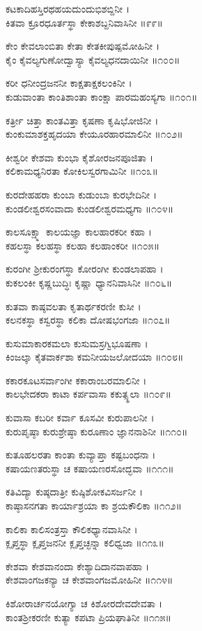 ಕಟಕಾದಿಹಸ್ತಿರಥಹಯದುಂದುಭಿಶಬ್ದಿನೀ ।\\
ಕಿತವಾ ಕ್ರೂರಧೂರ್ತಸ್ಥಾ ಕೇಕಾಶಬ್ದನಿವಾಸಿನೀ ॥೯೯॥

ಕೇಂ ಕೇವಲಾಂಬಿತಾ ಕೇತಾ ಕೇತಕೀಪುಷ್ಪಮೋಹಿನೀ ।\\
ಕೈಂ ಕೈವಲ್ಯಗುಣೋದ್ವಾಸ್ಯಾ ಕೈವಲ್ಯಧನದಾಯಿನೀ ॥೧೦೦॥

ಕರೀ ಧನೀಂದ್ರಜನನೀ ಕಾಕ್ಷತಾಕ್ಷಕಲಂಕಿನೀ ।\\
ಕುಡುವಾಂತಾ ಕಾಂತಿಶಾಂತಾ ಕಾಂಕ್ಷಾ ಪಾರಮಹಂಸ್ಯಗಾ ॥೧೦೧॥

ಕರ್ತ್ರೀ ಚಿತ್ತಾ ಕಾಂತವಿತ್ತಾ ಕೃಷಣಾ ಕೃಷಿಭೋಜಿನೀ ।\\
ಕುಂಕುಮಾಶಕ್ತಹೃದಯಾ ಕೇಯೂರಹಾರಮಾಲಿನೀ ॥೧೦೨॥

ಕೀಶ್ವರೀ ಕೇಶವಾ ಕುಂಭಾ ಕೈಶೋರಜನಪೂಜಿತಾ ।\\
ಕಲಿಕಾಮಧ್ಯನಿರತಾ ಕೋಕಿಲಸ್ವರಗಾಮಿನೀ ॥೧೦೩॥

ಕುರದೇಹಹರಾ ಕುಂಬಾ ಕುಡುಂಬಾ ಕುರಭೇದಿನೀ ।\\
ಕುಂಡಲೀಶ್ವರಸಂವಾದಾ ಕುಂಡಲೀಶ್ವರಮಧ್ಯಗಾ ॥೧೦೪॥

ಕಾಲಸೂಕ್ಷ್ಮಾ ಕಾಲಯಜ್ಞಾ ಕಾಲಹಾರಕರೀ ಕಹಾ ।\\
ಕಹಲಸ್ಥಾ ಕಲಹಸ್ಥಾ ಕಲಹಾ ಕಲಹಾಂಕರೀ ॥೧೦೫॥

ಕುರಂಗೀ ಶ್ರೀಕುರಂಗಸ್ಥಾ ಕೋರಂಗೀ ಕುಂಡಲಾಪಹಾ ।\\
ಕುಕಲಂಕೀ ಕೃಷ್ಣಬುದ್ಧಿಃ ಕೃಷ್ಣಾ ಧ್ಯಾನನಿವಾಸಿನೀ ॥೧೦೬॥

ಕುತವಾ ಕಾಷ್ಠವಲತಾ ಕೃತಾರ್ಥಕರಣೀ ಕುಸೀ ।\\
ಕಲನಕಸ್ಥಾ ಕಸ್ವರಸ್ಥಾ ಕಲಿಕಾ ದೋಷಭಂಗಜಾ ॥೧೦೭॥

ಕುಸುಮಾಕಾರಕಮಲಾ ಕುಸುಮಸ್ರಗ್ವಿಭೂಷಣಾ ।\\
ಕಿಂಜಲ್ಕಾ ಕೈತವಾರ್ಕಶಾ ಕಮನೀಯಜಲೋದಯಾ ॥೧೦೮॥

ಕಕಾರಕೂಟಸರ್ವಾಂಗೀ ಕಕಾರಾಂಬರಮಾಲಿನೀ ।\\
ಕಾಲಭೇದಕರಾ ಕಾಟಾ ಕರ್ಪವಾಸಾ ಕಕುತ್ಸ್ಥಲಾ ॥೧೦೯॥

ಕುವಾಸಾ ಕಬರೀ ಕರ್ವಾ ಕೂಸವೀ ಕುರುಪಾಲನೀ ।\\
ಕುರುಪೃಷ್ಠಾ ಕುರುಶ್ರೇಷ್ಠಾ ಕುರೂಣಾಂ ಜ್ಞಾನನಾಶಿನೀ ॥೧೧೦॥

ಕುತೂಹಲರತಾ ಕಾಂತಾ ಕುವ್ಯಾಪ್ತಾ ಕಷ್ಟಬಂಧನಾ ।\\
ಕಷಾಯಣತರುಸ್ಥಾ ಚ ಕಷಾಯಣರಸೋದ್ಭವಾ ॥೧೧೧॥

ಕತಿವಿದ್ಯಾ ಕುಷ್ಠದಾತ್ರೀ ಕುಷ್ಠಿಶೋಕವಿಸರ್ಜನೀ ।\\
ಕಾಷ್ಠಾಸನಗತಾ ಕಾರ್ಯಾಶ್ರಯಾ ಕಾ ಶ್ರಯಕೌಲಿಕಾ ॥೧೧೨॥

ಕಾಲಿಕಾ ಕಾಲಿಸಂತ್ರಸ್ತಾ ಕೌಲಿಕಧ್ಯಾನವಾಸಿನೀ ।\\
ಕ್ಲೃಪ್ತಸ್ಥಾ ಕ್ಲೃಪ್ತಜನನೀ ಕ್ಲೃಪ್ತಚ್ಛನ್ನಾ ಕಲಿಧ್ವಜಾ ॥೧೧೩॥

ಕೇಶವಾ ಕೇಶವಾನಂದಾ ಕೇಶ್ಯಾದಿದಾನವಾಪಹಾ ।\\
ಕೇಶವಾಂಗಜಕನ್ಯಾ ಚ ಕೇಶವಾಂಗಜಮೋಹಿನೀ ॥೧೧೪॥

ಕಿಶೋರಾರ್ಚನಯೋಗ್ಯಾ ಚ ಕಿಶೋರದೇವದೇವತಾ ।\\
ಕಾಂತಶ್ರೀಕರಣೀ ಕುತ್ಯಾ ಕಪಟಾ ಪ್ರಿಯಘಾತಿನೀ ॥೧೧೫॥

